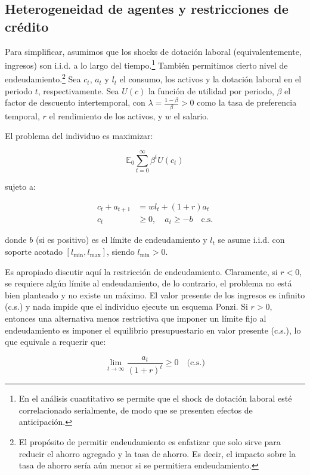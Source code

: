 \documentclass[a4paper,12pt]{article}
\begin{document}
\subsection{Heterogeneidad de agentes y restricciones de crédito}

Para simplificar, asumimos que los shocks de dotación laboral (equivalentemente, ingresos) son i.i.d. a lo largo del tiempo.\footnote{En el análisis cuantitativo se permite que el shock de dotación laboral esté correlacionado serialmente, de modo que se presenten efectos de anticipación.} También permitimos cierto nivel de endeudamiento.\footnote{El propósito de permitir endeudamiento es enfatizar que solo sirve para reducir el ahorro agregado y la tasa de ahorro. Es decir, el impacto sobre la tasa de ahorro sería aún menor si se permitiera endeudamiento.} Sea $c_t$, $a_t$ y $l_t$ el consumo, los activos y la dotación laboral en el periodo $t$, respectivamente. Sea $U(c)$ la función de utilidad por periodo, $\beta$ el factor de descuento intertemporal, con $\lambda = \frac{1 - \beta}{\beta} > 0$ como la tasa de preferencia temporal, $r$ el rendimiento de los activos, y $w$ el salario.

El problema del individuo es maximizar:

\begin{equation}
	\mathbb{E}_0 \sum_{t=0}^{\infty} \beta^t U(c_t)
\end{equation}

sujeto a:

\begin{align}
	c_t + a_{t+1} &= w l_t + (1 + r) a_t \\
	c_t &\geq 0, \quad a_t \geq -b \quad \text{c.s.}
\end{align}

donde $b$ (si es positivo) es el límite de endeudamiento y $l_t$ se asume i.i.d. con soporte acotado $[l_{\min}, l_{\max}]$, siendo $l_{\min} > 0$.

Es apropiado discutir aquí la restricción de endeudamiento. Claramente, si $r < 0$, se requiere algún límite al endeudamiento, de lo contrario, el problema no está bien planteado y no existe un máximo. El valor presente de los ingresos es infinito (c.s.) y nada impide que el individuo ejecute un esquema Ponzi. Si $r > 0$, entonces una alternativa menos restrictiva que imponer un límite fijo al endeudamiento es imponer el equilibrio presupuestario en valor presente (c.s.), lo que equivale a requerir que:

		\begin{equation}
\lim_{t \to \infty} \frac{a_t}{(1 + r)^t} \geq 0 \quad \text{(c.s.)}
		\end{equation}
\end{document}
